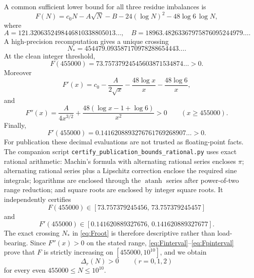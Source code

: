 \documentclass[11pt]{article}
\theoremstyle{definition}
\begin{document}
A common sufficient lower bound for all three residue imbalances is
\begin{equation}\label{eq:F}
F(N)
=c_0N
-A\sqrt N
-B
-24(\log N)^2
-48\log6\,\log N,
\end{equation}
where
\[
A=121.3206352498446810338805013\ldots,
\quad
B=18963.48263367975876095244979\ldots.
\]
A high-precision recomputation gives a unique crossing
\begin{equation}\label{eq:Froot}
N_*
=454479.093587170978288654443\ldots.
\end{equation}
At the clean integer threshold,
\begin{equation}\label{eq:F455}
\boxed{
F(455000)
=73.75737924545603871534874\ldots>0.
}
\end{equation}
Moreover
\begin{equation}\label{eq:Fprime}
F'(x)
=c_0-\frac{A}{2\sqrt x}
-\frac{48\log x}{x}
-\frac{48\log6}{x},
\end{equation}
and
\begin{equation}\label{eq:F2}
F''(x)
=\frac{A}{4x^{3/2}}
+\frac{48(\log x-1+\log6)}{x^2}>0
\qquad(x\ge455000).
\end{equation}
Finally,
\begin{equation}\label{eq:Fp455}
F'(455000)
=0.1416208893276761769268907\ldots>0.
\end{equation}
For publication these decimal evaluations are not trusted as floating-point facts. The companion script \texttt{certify\_publication\_bounds\_rational.py} uses exact rational arithmetic: Machin's formula with alternating rational series encloses $\pi$; alternating rational series plus a Lipschitz correction enclose the required sine integrals; logarithms are enclosed through the $\operatorname{atanh}$ series after power-of-two range reduction; and square roots are enclosed by integer square roots. It independently certifies
\begin{equation}\label{eq:Finterval}
\boxed{F(455000)\in[73.757379245456,\,73.757379245457]}
\end{equation}
and
\begin{equation}\label{eq:Fpinterval}
\boxed{F'(455000)\in[0.141620889327676,\,0.141620889327677].}
\end{equation}
The exact crossing $N_*$ in \eqref{eq:Froot} is therefore descriptive rather than load-bearing. Since $F''(x)>0$ on the stated range, \eqref{eq:Finterval}--\eqref{eq:Fpinterval} prove that $F$ is strictly increasing on $[455000,10^{10}]$, and we obtain
\begin{equation}\label{eq:finiteanalytic-positive}
\Delta_r(N)>0
\qquad(r=0,1,2)
\end{equation}
for every even $455000\le N\le10^{10}$.
\end{document}
